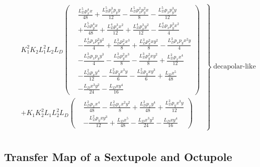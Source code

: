 \footnotesize
\begin{equation}
  \begin{aligned}
      &\left.
      \begin{aligned}
      &K_{1}^{2} K_{2} L_{1}^{2} L_{2} L_{D} \left(
     \begin{aligned}
       &\frac{L_{D}^{5} p_{x}^{4} x}{48} + \frac{L_{D}^{5} p_{x}^{3} p_{y} y}{12} - \frac{L_{D}^{5} p_{x}^{2} p_{y}^{2} x}{8} - \frac{L_{D}^{5} p_{x} p_{y}^{3} y}{12} \\
       &+ \frac{L_{D}^{5} p_{y}^{4} x}{48} + \frac{L_{D}^{4} p_{x}^{3} x^{2}}{12} + \frac{L_{D}^{4} p_{x}^{3} y^{2}}{12}- \frac{L_{D}^{4} p_{x} p_{y}^{2} x^{2}}{4} \\
       &- \frac{L_{D}^{4} p_{x} p_{y}^{2} y^{2}}{4} + \frac{L_{D}^{3} p_{x}^{2} x^{3}}{8} + \frac{L_{D}^{3} p_{x}^{2} x y^{2}}{8} - \frac{L_{D}^{3} p_{x} p_{y} x^{2} y}{4} \\
       &- \frac{L_{D}^{3} p_{x} p_{y} y^{3}}{4} - \frac{L_{D}^{3} p_{y}^{2} x^{3}}{8} - \frac{L_{D}^{3} p_{y}^{2} x y^{2}}{8} + \frac{L_{D}^{2} p_{x} x^{4}}{12} \\
       &- \frac{L_{D}^{2} p_{x} y^{4}}{12} - \frac{L_{D}^{2} p_{y} x^{3} y}{6} - \frac{L_{D}^{2} p_{y} x y^{3}}{6} + \frac{L_{D} x^{5}}{48} \\
       &- \frac{L_{D} x^{3} y^{2}}{24} - \frac{L_{D} x y^{4}}{16}
     \end{aligned} \right) \\
      &+ K_{1} K_{2}^{2} L_{1} L_{2}^{2} L_{D} \left(
      \begin{aligned}
        &\frac{L_{D}^{2} p_{x} x^{4}}{48} - \frac{L_{D}^{2} p_{x} x^{2} y^{2}}{8} + \frac{L_{D}^{2} p_{x} y^{4}}{48} + \frac{L_{D}^{2} p_{y} x^{3} y}{12} \\
        &- \frac{L_{D}^{2} p_{y} x y^{3}}{12} + \frac{L_{D} x^{5}}{48} - \frac{L_{D} x^{3} y^{2}}{24} - \frac{L_{D} x y^{4}}{16}
      \end{aligned}\right)
      \end{aligned}
      \; \right\} \; \text{decapolar-like} \\
  \end{aligned}
\end{equation}
\normalsize


\subsection{Transfer Map of a Sextupole and Octupole}
\label{appendix:transfer_map:sextupole_and_octupole}

